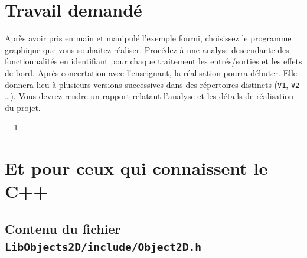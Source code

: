 \documentclass[12pt]{article}
\begin{document}

\section{Travail demand\'e}

Apr\`es avoir pris en main et manipul\'e l'exemple fourni, choisissez le
programme graphique que vous souhaitez r\'ealiser. Proc\'edez \`a une analyse
descendante des fonctionnalit\'es en identifiant pour chaque traitement 
les entr\'es/sorties et les effets de bord. Apr\`es concertation avec
l'enseignant, la r\'ealisation pourra d\'ebuter. Elle donnera lieu \`a
plusieurs versions successives dans des r\'epertoires distincts (\verb!V1!,
\verb!V2! \ldots). Vous devrez rendre un rapport relatant l'analyse et les
d\'etails de r\'ealisation du projet.

 = 1
\newpage
\section{Et pour ceux qui connaissent le C++}

\subsection{Contenu du fichier {\tt LibObjects2D/include/Object2D.h}}
\end{document}
